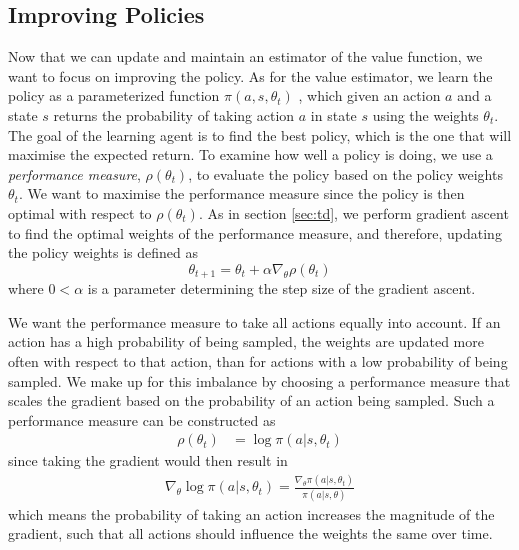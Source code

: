 \documentclass[11pt]{article}
\begin{document}
\subsection{Improving Policies}
\label{sec:improv}
Now that we can update and maintain an estimator of the value function, we want
to focus on improving the policy.
As for the value estimator, we learn the policy as a parameterized function $\pi(a, s, \theta_t)$
, which given an action $a$ and a state $s$ returns the probability
of taking action $a$ in state $s$ using the weights $\theta_t$.
The goal of the learning agent is to find the best policy, which is the one 
that will maximise the expected return.
To examine how well a policy is doing, we use a \textit{performance measure}, $\rho(\theta_t)$, to evaluate
the policy based on the policy weights $\theta_t$.
We want to maximise the performance measure since the policy is then optimal with
respect to $\rho(\theta_t)$.
As in section \ref{sec:td},
we perform gradient ascent to find the optimal weights of the performance measure,
and therefore, updating the policy weights is defined as
\begin{equation}
    \theta_{t+1} = \theta_t + \alpha \nabla_{\theta} \rho(\theta_t)
\end{equation}
where $0 < \alpha$ is a parameter determining the step size of the gradient ascent.

We want the performance measure to take all actions equally into account.
If an action has a high probability of being sampled, the weights are
updated more often with respect to that action, than for actions with a low probability of being sampled.
We make up for this imbalance by choosing a performance measure
that scales the gradient based on the probability of an action being sampled.
Such a performance measure can be constructed as
\begin{equation}
    \begin{aligned}
        \rho(\theta_t) & = \log\pi(a|s, \theta_t)
    \end{aligned}
\end{equation}
since taking the gradient would then result in
\begin{equation}\label{per_mes}
    \begin{aligned}
        \nabla_{\theta} \log\pi(a|s, \theta_t) = \frac{\nabla_{\theta}\pi(a|s, \theta_t)}{\pi(a|s,\theta)}
    \end{aligned}
\end{equation}
which means the probability of taking an action increases the magnitude of the gradient,
such that all actions should influence the weights the same over time.
\end{document}
